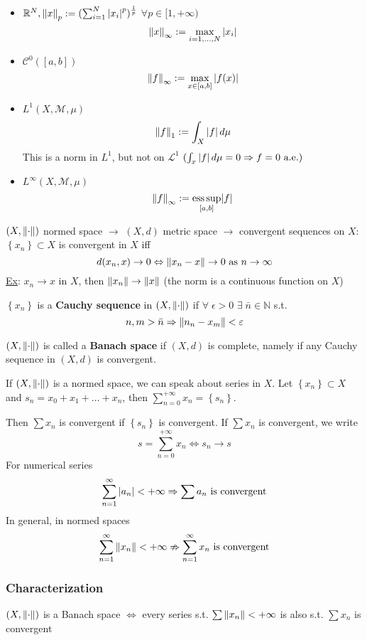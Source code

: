 \begin{itemize}
    \item \(\mathbb{R}^N, \norm{x}_p := (\sum_{i = 1}^N \abs{x_i}^p)^{\frac{1}{p}}\) \(\forall p \in [1, +\infty)\)
    \[
        \norm{x}_{\infty} := \max_{i = 1, \ldots, N} \abs{x_i}
    \]
    \item \(\mathcal{C}^0([a,b])\) \[\norm{f}_{\infty} := \max_{x \in [a,b]} \abs{f(x)}\]
    \item \(L^1(X, \mathcal{M}, \mu)\) \[\norm{f}_1 := \int_X \abs{f} \, d\mu\] This is a norm in \(L^1\), but not on \(\mathcal{L}^1\) \((\int_x \abs{f} \, d\mu = 0 \Rightarrow f = 0 \mbox{ a.e.})\)
    \item \(L^{\infty}(X, \mathcal{M}, \mu)\) \[\norm{f}_{\infty} := \underset{[a,b]}{\text{ess}\, \text{sup}} \abs{f}\]
\end{itemize}
\((X, \norm{\cdot})\) normed space \(\to\) \((X, d)\) metric space \(\to\) convergent sequences on \(X\): \(\left\{ x_n \right\} \subset X\) is convergent in \(X\) iff 
\[
    d(x_n, x) \to 0 \Leftrightarrow \norm{x_n -x} \to 0 \mbox{ as } n \to \infty
\]
\noindent\underline{Ex}: \(x_n \to x\) in \(X\), then \(\norm{x_n} \to \norm{x}\) (the norm is a continuous function on \(X\))
\begin{definition}
    \(\left\{ x_n \right\}\) is a \textbf{Cauchy sequence} in \((X, \norm{\cdot})\) if \(\forall \; \epsilon > 0\) \(\exists \; \bar{n} \in \mathbb{N}\) s.t. 
    \[
        n,m > \bar{n} \Rightarrow \norm{n_n-x_m} < \varepsilon
    \]
\end{definition}
\begin{definition}
    \((X, \norm{\cdot})\) is called a \textbf{Banach space} if \((X, d)\) is complete, namely if any Cauchy sequence in \((X, d)\) is convergent.
\end{definition}
If \((X, \norm{\cdot})\) is a normed space, we can speak about series in \(X\). Let \(\left\{ x_n \right\} \subset X\) and \(s_n = x_0 + x_1 + \ldots + x_n\), then \(\sum_{n=0}^{+\infty} x_n = \left\{ s_n \right\}\). 

Then \(\sum x_n\) is convergent if \(\left\{ s_n \right\}\) is convergent. If \(\sum x_n\) is convergent, we write 
\[
    s = \sum_{n = 0}^{+\infty} x_n \Leftrightarrow s_n \to s
\]
For numerical series
\[
    \sum_{n=1}^{\infty} \abs{a_n} < +\infty \Rightarrow \sum a_n \mbox{ is convergent}
\]
In general, in normed spaces 
\[
    \sum_{n=1}^{\infty} \norm{x_n} < +\infty \nRightarrow \sum_{n=1}^{\infty} x_n \mbox{ is convergent}
\]
\subsubsection*{Characterization}
\((X, \norm{\cdot})\) is a Banach space \(\Leftrightarrow\) every series s.t. \(\sum \norm{x_n} < +\infty\) is also s.t. \(\sum x_n\) is convergent